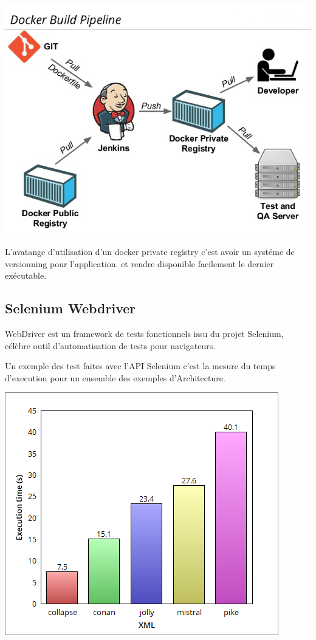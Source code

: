\documentclass [a4paper,11pt]{article}
\begin{document}
\begin{center}
\includegraphics[scale=0.4]{img/registry.png}
\end{center}

L'avatange d'utilisation d'un docker private registry c'est avoir un systéme de versionning pour l'application. et rendre disponible facilement le dernier exécutable.
\subsection{Selenium Webdriver}
WebDriver est un framework de tests fonctionnels issu du projet Selenium, célèbre outil d'automatisation de tests pour navigateurs.\newline

Un exemple des test faites avec l'API Selenium c'est la mesure du temps d'execution pour un ensemble des exemples d'Architecture.

\begin{center}
\includegraphics[scale=0.4]{img/benchmark.png}
\end{center}
\end{document}
